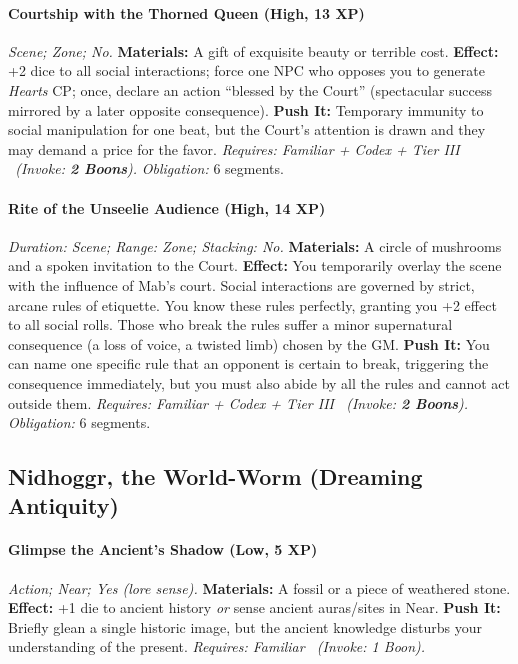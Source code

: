 \paragraph{Courtship with the Thorned Queen (High, 13 XP)} \emph{Scene; Zone; No.}
\textbf{Materials:} A gift of exquisite beauty or terrible cost.
\textbf{Effect:} +2 dice to all social interactions; force one NPC who opposes you to generate \emph{Hearts} CP; once, declare an action ``blessed by the Court'' (spectacular success mirrored by a later opposite consequence).
\textbf{Push It:} Temporary immunity to social manipulation for one beat, but the Court's attention is drawn and they may demand a price for the favor.
\emph{Requires: Familiar + Codex + Tier III \ (\textit{Invoke:} \textbf{2 Boons}).}
\emph{Obligation:} 6 segments.

\paragraph{Rite of the Unseelie Audience (High, 14 XP)} \emph{Duration: Scene; Range: Zone; Stacking: No.}
\textbf{Materials:} A circle of mushrooms and a spoken invitation to the Court.
\textbf{Effect:} You temporarily overlay the scene with the influence of Mab's court. Social interactions are governed by strict, arcane rules of etiquette. You know these rules perfectly, granting you +2 effect to all social rolls. Those who break the rules suffer a minor supernatural consequence (a loss of voice, a twisted limb) chosen by the GM.
\textbf{Push It:} You can name one specific rule that an opponent is certain to break, triggering the consequence immediately, but you must also abide by all the rules and cannot act outside them.
\emph{Requires: Familiar + Codex + Tier III \ (\textit{Invoke:} \textbf{2 Boons}).}
\emph{Obligation:} 6 segments.

\subsection{Nidhoggr, the World-Worm (Dreaming Antiquity)}
\paragraph{Glimpse the Ancient's Shadow (Low, 5 XP)} \emph{Action; Near; Yes (lore sense).}
\textbf{Materials:} A fossil or a piece of weathered stone.
\textbf{Effect:} +1 die to ancient history \emph{or} sense ancient auras/sites in Near.
\textbf{Push It:} Briefly glean a single historic image, but the ancient knowledge disturbs your understanding of the present.
\emph{Requires: Familiar \ (\textit{Invoke:} 1 Boon).}
